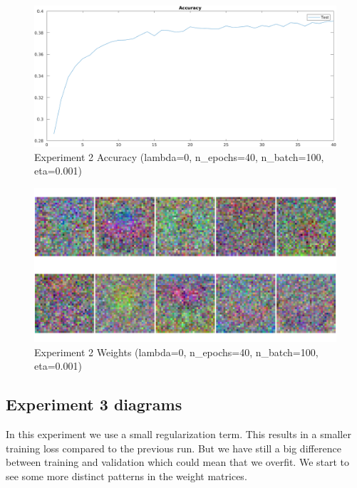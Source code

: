     \begin{figure}[ht]
        \includegraphics[width=\textwidth]{../code/result_pics/lambda=0, n_epochs=40, n_batch=100, eta=.001/accuracy.png}
        \caption{Experiment 2 Accuracy (lambda=0, n\_epochs=40, n\_batch=100, eta=0.001)}
        \label{fig:accuracy2}
    \end{figure}

    \begin{figure}[ht]
        \includegraphics[width=\textwidth]{../code/result_pics/lambda=0, n_epochs=40, n_batch=100, eta=.001/weights.png}
        \caption{Experiment 2 Weights (lambda=0, n\_epochs=40, n\_batch=100, eta=0.001)}
        \label{fig:weights2}
    \end{figure}

\clearpage
\subsection{Experiment 3 diagrams}
In this experiment we use a small regularization term. This results in a smaller training loss compared to the previous run.
But we have still a big difference between training and validation which could mean that we overfit. We start to see some more distinct patterns
in the weight matrices.

